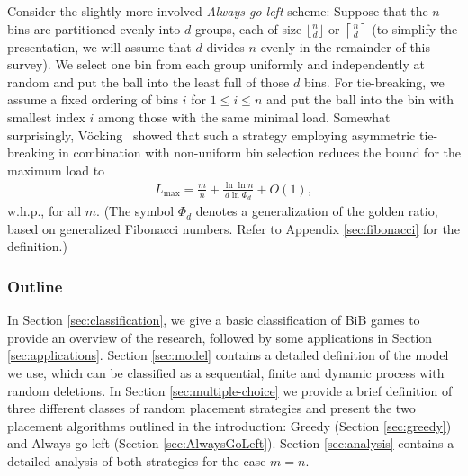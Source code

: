 \documentclass[a4paper,12pt]{article}
\newcommand\load{L_{\mathrm{max}}}
\begin{document}
Consider the slightly more involved \emph{Always-go-left} scheme: Suppose that the $n$ bins are partitioned evenly into $d$ groups, each of size $\lfloor \frac{n}{d}\rfloor$ or $\left\lceil\frac{n}{d}\right\rceil$ (to simplify the presentation, we will assume that $d$ divides $n$ evenly in the remainder of this survey). We select one bin from each group uniformly and independently at random and put the ball into the least full of those $d$ bins. For tie-breaking, we assume a fixed ordering of bins $i$ for $1 \leq i \leq n$ and put the ball into the bin with smallest index $i$ among those with the same minimal load. Somewhat surprisingly, V\"ocking~\cite{VOC03} showed that such a strategy employing asymmetric tie-breaking in combination with non-uniform bin selection reduces the bound for the maximum load to
\begin{align*}
\load = \frac{m}{n} + \frac{\ln\ln n}{d  \ln \Phi_d} + O(1),
\end{align*}
w.h.p., for all $m$. (The symbol $\Phi_d$ denotes a generalization of the golden ratio, based on generalized Fibonacci numbers. Refer to Appendix \ref{sec:fibonacci} for the definition.) 

\subsubsection*{Outline}
In Section \ref{sec:classification}, we give a basic classification of BiB games to provide an overview of the research, followed by some applications in Section \ref{sec:applications}. Section \ref{sec:model} contains a detailed definition of the model we use, which can be classified as a sequential, finite and dynamic process with random deletions. In Section \ref{sec:multiple-choice} we provide a brief definition of three different classes of random placement strategies and present the two placement algorithms outlined in the introduction: Greedy (Section \ref{sec:greedy}) and Always-go-left (Section \ref{sec:AlwaysGoLeft}). Section \ref{sec:analysis} contains a detailed analysis of both strategies for the case $m=n$. 
\end{document}
